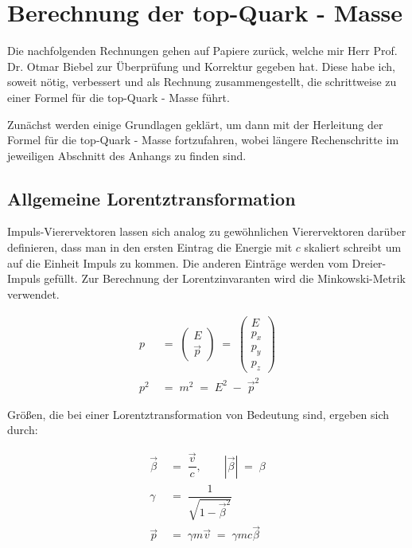 \documentclass[
a4paper,                                %
twoside,                                %
BCOR1.4cm,                      %
ngerman,                                %
10pt,                           %
headings=normal,                %
headsepline,                    %
clearplainpage, %
final,                                  %
div=14,
parskip=full
]{scrbook}
\begin{document}
\newpage

\chapter{Berechnung der top-Quark - Masse}

Die nachfolgenden Rechnungen gehen auf Papiere zur\"uck, welche mir Herr Prof. Dr. Otmar Biebel zur \"Uberpr\"ufung und Korrektur gegeben hat. Diese habe ich, soweit n\"otig, verbessert und als Rechnung zusammengestellt, die schrittweise zu einer Formel f\"ur die top-Quark - Masse f\"uhrt.

Zun\"achst werden einige Grundlagen gekl\"art, um dann mit der Herleitung der Formel f\"ur die top-Quark - Masse fortzufahren, wobei l\"angere Rechenschritte im jeweiligen Abschnitt des Anhangs zu finden sind.

\section{Allgemeine Lorentztransformation}

Impuls-Vierervektoren lassen sich analog zu gew\"ohnlichen Vierervektoren dar\"uber definieren, dass man in den ersten Eintrag die Energie mit $ c $ skaliert schreibt um auf die Einheit Impuls zu kommen. Die anderen Eintr\"age werden vom Dreier-Impuls gef\"ullt. Zur Berechnung der Lorentzinvaranten wird die Minkowski-Metrik verwendet.

\begin{align}
	p
\;&=\;
	\begin{pmatrix}
			E \\ \vec{p}
	\end{pmatrix}
\;=\;
	\begin{pmatrix}
			E \\ p_{x} \\ p_{y} \\ p_{z}
	\end{pmatrix}
\\
	p^{2}
\;&=\;
	m^{2}\;=\;E^{2}\;-\;\vec{p}^{2}
\label{loinv}
\end{align}

Gr\"o\ss en, die bei einer Lorentztransformation von Bedeutung sind, ergeben sich durch:

\begin{align}
	\vec{\beta}
\;&=\;
	\dfrac{\vec{v}}{c}
,\qquad
	|\vec{\beta}|
  \;=\;
  	\beta
\label{beta}
\\
	\gamma
\;&=\;
	\dfrac{1}{\sqrt{1 - \vec{\beta}^2}}
\label{gamma}
\\
	\vec{p}
\;&=\;
	\gamma m \vec{v}\;=\;\gamma m c \vec{\beta}
\end{align}
\end{document}

